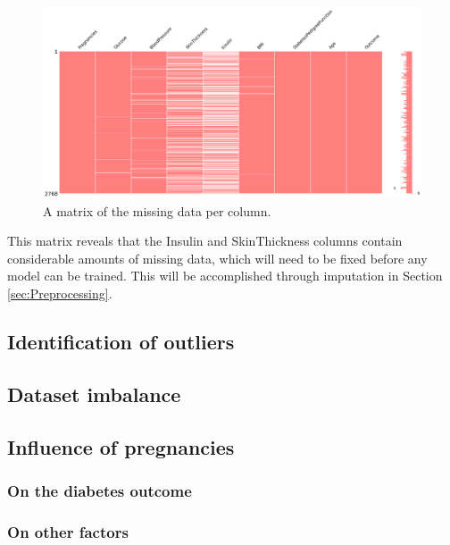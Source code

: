 \documentclass[12pt]{report}
\newcommand{\para}{\vspace{8pt}\noindent}
\begin{document}
\begin{figure}[H]
    \centering
    \includegraphics[width=\linewidth]{EDA/Plots/MissingnoMatrix.png}
    \caption{A matrix of the missing data per column.}
    \label{fig:MissingnoMatrix}
\end{figure}


\para This matrix reveals that the Insulin and SkinThickness columns contain considerable amounts of missing data, 
which will need to be fixed before any model can be trained. This will be accomplished through imputation in Section 
\ref{sec:Preprocessing}.



\subsection{Identification of outliers}


\subsection{Dataset imbalance}


\subsection{Influence of pregnancies}
\subsubsection{On the diabetes outcome} 

\subsubsection{On other factors}
\end{document}
